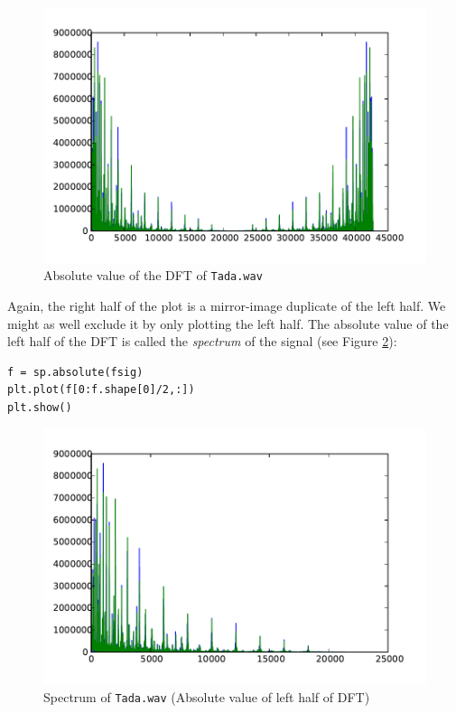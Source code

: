 \begin{figure}[ht]\caption{Absolute value of the DFT of \texttt{Tada.wav}}\label{tadaspec}\centering\includegraphics[width=\textwidth]{tadaspec}\end{figure}
Again, the right half of the plot is a mirror-image duplicate of the left half. We might as well exclude it by only plotting the left half. The absolute value of the left half of  the DFT is called the \emph{spectrum} of the signal (see Figure \ref{tadaspec2}):
\begin{lstlisting}
f = sp.absolute(fsig)
plt.plot(f[0:f.shape[0]/2,:])
plt.show()
\end{lstlisting}
\begin{figure}[ht]\caption{Spectrum of \texttt{Tada.wav} (Absolute value of left half of DFT)}\label{tadaspec2}\centering\includegraphics[width=\textwidth]{tadaspec2}\end{figure}
